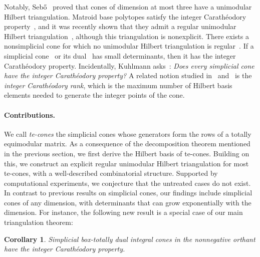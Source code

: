 \documentclass[11pt,a4paper]{amsart}
\theoremstyle{plain}
\newtheorem{corollary}[theorem]{Corollary}
\theoremstyle{definition}
\begin{document}
Notably, Seb\H o~\cite{Sebo_1990} proved that cones of dimension at most three have a unimodular Hilbert triangulation.
Matroid base polytopes satisfy the integer Carath\'eodory property~\cite{Gijswijt_Regts_2012}, and it was recently shown that they admit a regular unimodular Hilbert triangulation~\cite{Backman_Liu_2024}, although this triangulation is nonexplicit.
There exists a nonsimplicial cone for which no unimodular Hilbert triangulation is regular~\cite{Firla_Ziegler_1999}.
If a simplicial cone~\cite{Kuhlmann_2024} or its dual~\cite{Aliev_Henk_Hogan_Kuhlmann_Oertel_2024} has small determinants, then it has the integer Carath\'eodory property.
Incidentally, Kuhlmann asks~\cite{Kuhlmann_2024}: \textit{Does every simplicial cone have the integer Carath\'eodory property?}
A related notion studied in~\cite{Aliev_Henk_Hogan_Kuhlmann_Oertel_2024} and~\cite{Eisenbrand2006} is the \emph{integer Carath\'eodory rank}, which is the maximum number of Hilbert basis elements needed to generate the integer points of the cone.
\paragraph{\textbf{Contributions.}} 
We call {\em te-cones} the simplicial cones whose generators form the rows of a totally equimodular matrix.
As a consequence of the decomposition theorem mentioned in the previous section, we first derive the Hilbert basis of te-cones. Building on this, we construct an explicit regular unimodular Hilbert triangulation for most te-cones, with a well-described combinatorial structure. Supported by computational experiments, we conjecture that the untreated cases do not exist. In contrast to previous results on simplicial cones, our findings include simplicial cones of any dimension, with determinants that can grow exponentially with the dimension. For instance, the following new result is a special case of our main triangulation theorem:
\begin{corollary}\label{corollary:0/1_simplicial_box-integer_cones}
	Simplicial box-totally dual integral cones in the nonnegative orthant have the integer Carath\'eodory property.
\end{corollary}

\end{document}
